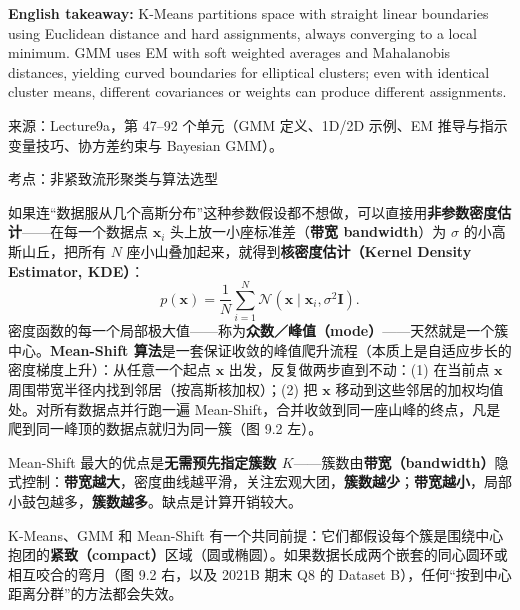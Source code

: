 \textbf{English takeaway:} K-Means partitions space with straight linear boundaries using Euclidean distance and hard assignments, always converging to a local minimum. GMM uses EM with soft weighted averages and Mahalanobis distances, yielding curved boundaries for elliptical clusters; even with identical cluster means, different covariances or weights can produce different assignments.

来源：Lecture9a，第 47–92 个单元（GMM 定义、1D/2D 示例、EM 推导与指示变量技巧、协方差约束与 Bayesian GMM）。



考点：非紧致流形聚类与算法选型 


如果连“数据服从几个高斯分布”这种参数假设都不想做，可以直接用\textbf{非参数密度估计}——在每一个数据点 $\mathbf{x}_i$ 头上放一小座标准差（\textbf{带宽 bandwidth}）为 $\sigma$ 的小高斯山丘，把所有 $N$ 座小山叠加起来，就得到\textbf{核密度估计（Kernel Density Estimator, KDE）}：
\[
p(\mathbf{x}) = \frac{1}{N}\sum_{i=1}^N \mathcal{N}(\mathbf{x} \mid \mathbf{x}_i, \sigma^2\mathbf{I}).
\tag{9.8}
\]
密度函数的每一个局部极大值——称为\textbf{众数／峰值（mode）}——天然就是一个簇中心。\textbf{Mean-Shift 算法}是一套保证收敛的峰值爬升流程（本质上是自适应步长的密度梯度上升）：从任意一个起点 $\mathbf{x}$ 出发，反复做两步直到不动：(1) 在当前点 $\mathbf{x}$ 周围带宽半径内找到邻居（按高斯核加权）；(2) 把 $\mathbf{x}$ 移动到这些邻居的加权均值处。对所有数据点并行跑一遍 Mean-Shift，合并收敛到同一座山峰的终点，凡是爬到同一峰顶的数据点就归为同一簇（图 9.2 左）。

Mean-Shift 最大的优点是\textbf{无需预先指定簇数 $K$}——簇数由\textbf{带宽（bandwidth）}隐式控制：\textbf{带宽越大}，密度曲线越平滑，关注宏观大团，\textbf{簇数越少}；\textbf{带宽越小}，局部小鼓包越多，\textbf{簇数越多}。缺点是计算开销较大。


K-Means、GMM 和 Mean-Shift 有一个共同前提：它们都假设每个簇是围绕中心抱团的\textbf{紧致（compact）}区域（圆或椭圆）。如果数据长成两个嵌套的同心圆环或相互咬合的弯月（图 9.2 右，以及 2021B 期末 Q8 的 Dataset B），任何“按到中心距离分群”的方法都会失效。

